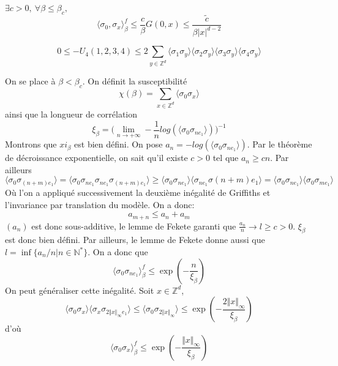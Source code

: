 \documentclass[a4paper,12pt]{report}
\begin{document}
\begin{thm}
$\exists c > 0, \ \forall \beta \leq \beta_c,$
$$
\langle \sigma_0, \sigma_x \rangle^f_{\beta} \leq \frac{c}{\beta} G(0,x) \leq \frac{\tilde{c}}{\beta \vert x \vert^{d-2}}
$$
\end{thm}

\begin{prop}
$$
0 \leq - U_4(1,2,3,4) \leq 2 \sum_{y \in \mathbb{Z}^d} \langle \sigma_1 \sigma_y \rangle \langle \sigma_2 \sigma_y \rangle \langle \sigma_3 \sigma_y \rangle \langle \sigma_4 \sigma_y \rangle
$$
\end{prop}

On se place à $\beta < \beta_c$. On définit la susceptibilité
$$
\chi(\beta) = \sum_{x \in \mathbb{Z}^d} \langle \sigma_0 \sigma_x \rangle
$$
ainsi que la longueur de corrélation
$$
\xi_{\beta} = \big( \lim_{n \rightarrow + \infty} - \frac{1}{n} log( \langle \sigma_0 \sigma_{n e_1} \rangle ) \big)^{-1}
$$
Montrons que $xi_{\beta}$ est bien défini. On pose $a_n = - log( \langle \sigma_0 \sigma_{n e_1} \rangle )$. Par le théorème de décroissance exponentielle, on sait qu'il existe $c>0$ tel que $a_n \geq c n$. Par ailleurs
$$
\langle \sigma_0 \sigma_{(n+m)e_1} \rangle = \langle \sigma_0 \sigma_{ne_1} \sigma_{ne_1} \sigma_{(n+m)e_1} \rangle 
\geq \langle \sigma_0 \sigma_{ne_1} \rangle \langle \sigma_{ne_1} \sigma{(n+m)e_1} \rangle 
= \langle \sigma_0 \sigma_{ne_1} \rangle \langle \sigma_0 \sigma_{me_1} \rangle
$$
Où l'on a appliqué successivement la deuxième inégalité de Griffiths et l'invariance par translation du modèle. On a donc:
$$
a_{m+n} \leq a_n + a_m
$$
$(a_n)$ est donc sous-additive, le lemme de Fekete garanti que $\frac{a_n}{n} \rightarrow l \geq c > 0$. $\xi_{\beta}$ est donc bien défini. Par ailleurs, le lemme de Fekete donne aussi que $l = \inf \{ a_n / n \vert n \in \mathbb{N}^* \}$. On a donc que
$$
\langle \sigma_0 \sigma_{ne_1} \rangle_{\beta}^f \leq \exp(- \frac{n}{\xi_{\beta}})
$$
On peut généraliser cette inégalité. Soit $x \in \mathbb{Z}^d$,
$$
\langle \sigma_0 \sigma_x \rangle \langle \sigma_x \sigma_{2 \Vert x \Vert_{\infty} e_1} \rangle \leq \langle \sigma_0 \sigma_{2 \Vert x \Vert_{\infty}} \rangle \leq \exp(-\frac{2 \Vert x \Vert_{\infty}}{\xi_{\beta}})
$$
d'où
$$
\langle \sigma_0 \sigma_x \rangle_{\beta}^f \leq \exp(-\frac{\Vert x \Vert_{\infty}}{\xi_{\beta}})
$$
\end{document}

